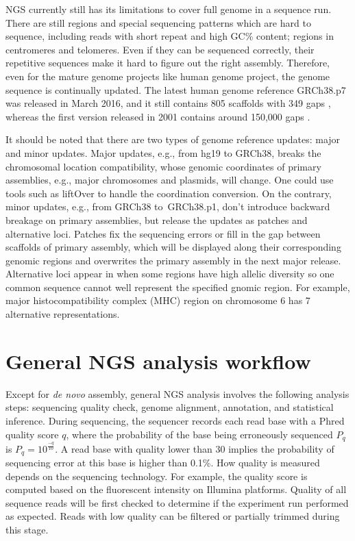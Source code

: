
NGS currently still has its limitations to cover full genome in a sequence run.
There are still regions and special sequencing patterns which are hard to
sequence, including reads with short repeat and high GC\% content; regions in
centromeres and telomeres. Even if they can be sequenced correctly, their
repetitive sequences make it hard to figure out the right assembly. Therefore,
even for the mature genome projects like human genome project, the genome
sequence is continually updated. The latest human genome reference GRCh38.p7
was released in March 2016, and it still contains 805 scaffolds with 349 gaps
\cite{:grch38p7}, whereas the first version released in 2001 contains around
150,000 gaps \cite{2010:e-pluribus-unum}.


It should be noted that there are two types of genome reference updates: major
and minor updates. Major updates, e.g., from hg19 to GRCh38, breaks the
chromosomal location compatibility, whose genomic coordinates of primary
assemblies, e.g., major chromosomes and plasmids, will change. One could use
tools such as liftOver to handle the coordination conversion. On the contrary,
minor updates, e.g., from GRCh38 to GRCh38.p1, don't introduce backward
breakage on primary assemblies, but release the updates as patches and
alternative loci. Patches fix the sequencing errors or fill in the gap between
scaffolds of primary assembly, which will be displayed along their
corresponding genomic regions and overwrites the primary assembly in the next
major release. Alternative loci appear in when some regions have high allelic
diversity so one common sequence cannot well represent the specified gnomic
region. For example, major histocompatibility complex (MHC) region on
chromosome 6 has 7 alternative representations.


%
%

\section{General NGS analysis workflow}

Except for \textit{de novo} assembly, general NGS analysis involves the
following analysis steps: sequencing quality check, genome alignment,
annotation, and statistical inference. During sequencing, the sequencer records
each read base with a Phred quality score $q$, where the probability of the
base being erroneously sequenced $P_q$ is $P_q = 10^{\frac{-q}{10}}$. A read
base with quality lower than 30 implies the probability of sequencing error at
this base is higher than 0.1\%. How quality is measured depends on the
sequencing technology. For example, the quality score is computed based on the
fluorescent intensity on Illumina platforms. Quality of all sequence reads will
be first checked to determine if the experiment run performed as expected.
Reads with low quality can be filtered or partially trimmed during this stage.

